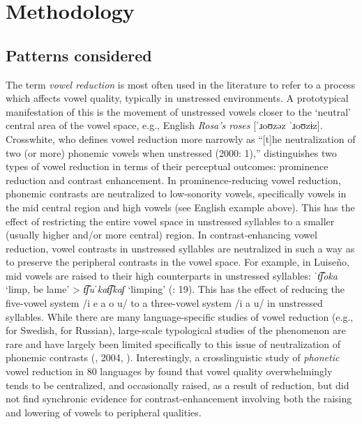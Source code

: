 \section{ Methodology}\label{sec:6.2}
\subsection{ Patterns considered}\label{sec:6.2.1}

  The term \textit{vowel reduction} is most often used in the literature to refer to a process which affects vowel quality, typically in unstressed environments. A prototypical manifestation of this is the movement of unstressed vowels closer to the ‘neutral’ central area of the vowel space, e.g., English \textit{Rosa’s roses} [\textit{ˈ}ɹoʊzəz \textit{ˈ}ɹoʊzɨz]. Crosswhite, who defines vowel reduction more narrowly as “[t]he neutralization of two (or more) phonemic vowels when unstressed (2000: 1),” distinguishes two types of vowel reduction in terms of their perceptual outcomes: prominence reduction and contrast enhancement. In prominence-reducing vowel reduction, phonemic contrasts are neutralized to low-sonority vowels, specifically vowels in the mid central region and high vowels (see English example above). This has the effect of restricting the entire vowel space in unstressed syllables to a smaller (usually higher and/or more central) region. In contrast-enhancing vowel reduction, vowel contrasts in unstressed syllables are neutralized in such a way as to preserve the peripheral contrasts in the vowel space. For example, in Luiseño, mid vowels are raised to their high counterparts in unstressed syllables: \textit{ˈt͡ʃoka} ‘limp, be lame’ > \textit{t͡ʃuˈkat͡ʃkaʃ} ‘limping’ (\citealt{MunroBenson1973}: 19). This has the effect of reducing the five-vowel system /i e a o u/ to a three-vowel system /i a u/ in unstressed syllables. While there are many language-specific studies of vowel reduction (e.g., \citealt{Lindblom1963} for Swedish, \citealt{PadgettTabain2005} for Russian), large-scale typological studies of the phenomenon are rare and have largely been limited specifically to this issue of neutralization of phonemic contrasts (\citealt{Crosswhite2001}, 2004, \citealt{Barnes2006}). Interestingly, a crosslinguistic study of \textit{phonetic} vowel reduction in 80 languages by \citet{KapatsinskiEtAl2019} found that vowel quality overwhelmingly tends to be centralized, and occasionally raised, as a result of reduction, but did not find synchronic evidence for contrast-enhancement involving both the raising and lowering of vowels to peripheral qualities.

